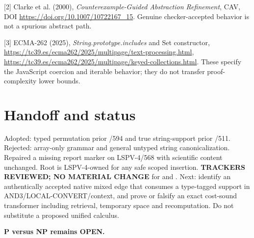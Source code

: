 \documentclass[11pt]{article}
\begin{document}
[2] Clarke et al. (2000), \emph{Counterexample-Guided Abstraction Refinement}, CAV, DOI \url{https://doi.org/10.1007/10722167_15}. Genuine checker-accepted behavior is not a spurious abstract path.

[3] ECMA-262 (2025), \emph{String.prototype.includes} and Set constructor, \url{https://tc39.es/ecma262/2025/multipage/text-processing.html}, \url{https://tc39.es/ecma262/2025/multipage/keyed-collections.html}. These specify the JavaScript coercion and iterable behavior; they do not transfer proof-complexity lower bounds.

\section*{Handoff and status}
Adopted: typed permutation prior /594 and true string-support prior /511. Rejected: array-only grammar and general untyped string canonicalization. Repaired a missing report marker on LSPV-4/568 with scientific content unchanged. Root  is LSPV-4-owned for any safe scoped insertion. \textbf{TRACKERS REVIEWED; NO MATERIAL CHANGE} for  and . Next: identify an authentically accepted native mixed edge that consumes a type-tagged support in AND3/LOCAL-CONVERT/context, and prove or falsify an exact cost-sound transformer including retrieval, temporary space and recomputation. Do not substitute a proposed unified calculus.

\noindent\textbf{P versus NP remains OPEN.}
\end{document}
